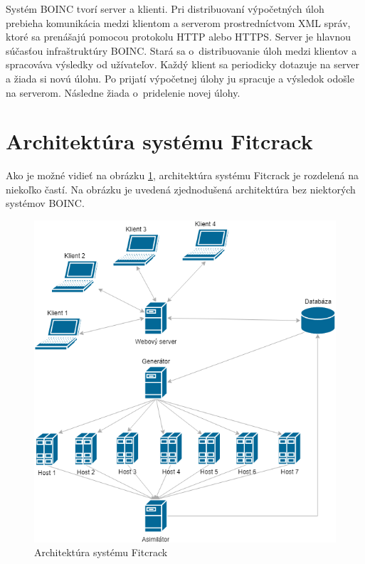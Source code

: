 \documentclass[slovak]{fitthesis}
\begin{document}
Systém BOINC tvorí server a klienti. Pri distribuovaní výpočetných úloh prebieha komunikácia medzi klientom a serverom prostredníctvom XML správ, ktoré sa prenášajú pomocou protokolu HTTP alebo HTTPS.
Server je hlavnou súčasťou infraštruktúry BOINC. Stará sa o~distribuovanie úloh medzi klientov a spracováva výsledky od užívateľov.
Každý klient sa periodicky dotazuje na server a žiada si novú úlohu. Po prijatí výpočetnej úlohy ju spracuje a výsledok odošle na serverom. Následne žiada o~pridelenie novej úlohy.\cite{boinccitace}


\section{Architektúra systému Fitcrack}
Ako je možné vidieť na obrázku \ref{fig:archFitcrack}, architektúra systému Fitcrack je rozdelená na niekoľko častí. Na obrázku je uvedená zjednodušená architektúra bez niektorých systémov BOINC.

\begin{figure}[h]
    \centering
    \includegraphics[scale=0.65]{obrazky/FitcrackSystem.png}
    \caption{Architektúra systému Fitcrack}
    \label{fig:archFitcrack}
\end{figure}
\end{document}
